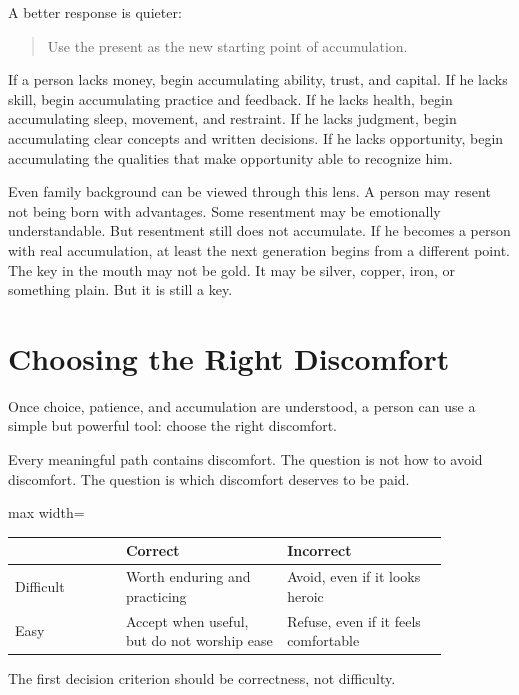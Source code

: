 A better response is quieter:

\begin{quote}
Use the present as the new starting point of accumulation.
\end{quote}

If a person lacks money, begin accumulating ability, trust, and capital. If he lacks skill, begin accumulating practice and feedback. If he lacks health, begin accumulating sleep, movement, and restraint. If he lacks judgment, begin accumulating clear concepts and written decisions. If he lacks opportunity, begin accumulating the qualities that make opportunity able to recognize him.

Even family background can be viewed through this lens. A person may resent not being born with advantages. Some resentment may be emotionally understandable. But resentment still does not accumulate. If he becomes a person with real accumulation, at least the next generation begins from a different point. The key in the mouth may not be gold. It may be silver, copper, iron, or something plain. But it is still a key.

\section*{Choosing the Right Discomfort}

Once choice, patience, and accumulation are understood, a person can use a simple but powerful tool: choose the right discomfort.

Every meaningful path contains discomfort. The question is not how to avoid discomfort. The question is which discomfort deserves to be paid.

\begin{center}
\begin{adjustbox}{max width=\linewidth}
\begin{tabular}{p{0.22\linewidth}p{0.32\linewidth}p{0.32\linewidth}}
\hline
 & Correct & Incorrect \\
\hline
Difficult & Worth enduring and practicing & Avoid, even if it looks heroic \\
Easy & Accept when useful, but do not worship ease & Refuse, even if it feels comfortable \\
\hline
\end{tabular}
\end{adjustbox}
\end{center}

The first decision criterion should be correctness, not difficulty.

